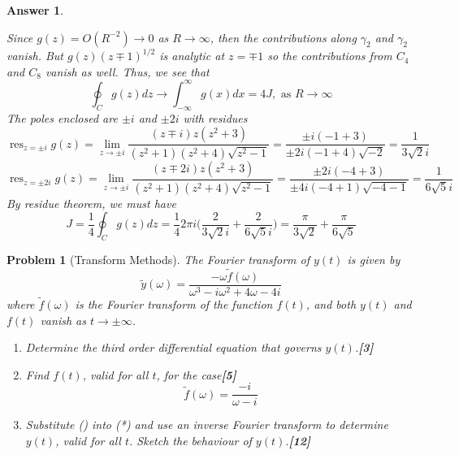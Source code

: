 \documentclass[a4paper]{article}
\DeclareMathOperator{\res}{res}
\newtheorem{ans}{Answer}[section]
\theoremstyle{new}
\newtheorem{qns}{Problem}[section]
\begin{document}
\begin{ans}
\begin{enumerate}[label=(\alph*)]
\begin{enumerate}[label=(\roman*)]
\begin{center}
  \end{center}
Since $g(z)=O(R^{-2})\rightarrow 0$ as $R\rightarrow\infty$, then the contributions along $\gamma_2$ and $\gamma_2$ vanish. But $g(z)(z\mp1)^{1/2}$ is analytic at $z=\mp 1$ so the contributions from $C_4$ and $C_8$ vanish as well. Thus, we see that
$$\oint_Cg(z)dz\rightarrow \int_{-\infty}^\infty g(x)dx=4J,\text{ as }R\rightarrow\infty$$
The poles enclosed are $\pm i$ and $\pm 2i$ with residues
$$\res_{z=\pm i}g(z)=\lim_{z\rightarrow\pm i}\frac{(z\mp i)z(z^2+3)}{(z^2+1)(z^2+4)\sqrt{z^2-1}}=\frac{\pm i(-1+3)}{\pm 2i(-1+4)\sqrt{-2}}=\frac{1}{3\sqrt{2}i}$$
$$\res_{z=\pm2i}g(z)=\lim_{z\rightarrow\pm i}\frac{(z\mp 2i)z(z^2+3)}{(z^2+1)(z^2+4)\sqrt{z^2-1}}=\frac{\pm 2i(-4+3)}{\pm 4i(-4+1)\sqrt{-4-1}}=\frac{1}{6\sqrt{5}i}$$
By residue theorem, we must have
$$J=\frac{1}{4}\oint_Cg(z)dz=\frac{1}{4}2\pi i\bigg(\frac{2}{3\sqrt{2}i}+\frac{2}{6\sqrt{5}i}\bigg)=\frac{\pi}{3\sqrt{2}}+\frac{\pi}{6\sqrt{5}}$$
\end{enumerate}
\end{enumerate}
\end{ans}
\newpage
\begin{qns}[Transform Methods]
The Fourier transform of $y(t)$ is given by
\begin{equation}
    \tilde{y}(\omega)=\frac{-\omega\tilde{f}(\omega)}{\omega^3-i\omega^2+4\omega-4i}\tag{*}
\end{equation}
where $\tilde{f}(\omega)$ is the Fourier transform of the function $f(t)$, and both $y(t)$ and $f(t)$ vanish as $t\rightarrow\pm\infty$.
\begin{enumerate}[label=(\alph*)]
\item Determine the third order differential equation that governs $y(t)$.\hfill\textbf{[3]}
\item Find $f(t)$, valid for all $t$, for the case\hfill\textbf{[5]}
\begin{equation}
    \tilde{f}(\omega)=\frac{-i}{\omega-i}\tag{\dag}
\end{equation}
\item Substitute (\dag) into (*) and use an inverse Fourier transform to determine $y(t)$, valid for all $t$. Sketch the behaviour of $y(t)$.\hfill\textbf{[12]}
\end{enumerate}
\end{qns}
\end{document}

